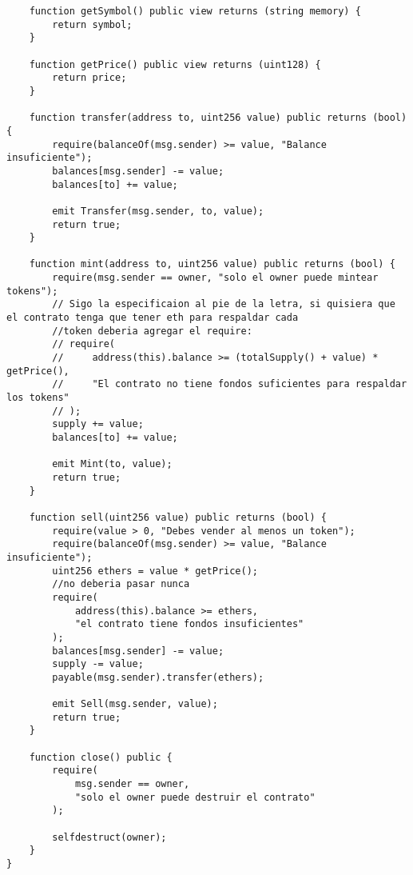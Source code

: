 \documentclass[12pt,addpoints,answers]{exam}
\begin{document}
\begin{questions}
\begin{parts}
\begin{verbatim}
    function getSymbol() public view returns (string memory) {
        return symbol;
    }

    function getPrice() public view returns (uint128) {
        return price;
    }

    function transfer(address to, uint256 value) public returns (bool) {
        require(balanceOf(msg.sender) >= value, "Balance insuficiente");
        balances[msg.sender] -= value;
        balances[to] += value;

        emit Transfer(msg.sender, to, value);
        return true;
    }

    function mint(address to, uint256 value) public returns (bool) {
        require(msg.sender == owner, "solo el owner puede mintear tokens");
        // Sigo la especificaion al pie de la letra, si quisiera que el contrato tenga que tener eth para respaldar cada
        //token deberia agregar el require:
        // require(
        //     address(this).balance >= (totalSupply() + value) * getPrice(),
        //     "El contrato no tiene fondos suficientes para respaldar los tokens"
        // );
        supply += value;
        balances[to] += value;

        emit Mint(to, value);
        return true;
    }

    function sell(uint256 value) public returns (bool) {
        require(value > 0, "Debes vender al menos un token");
        require(balanceOf(msg.sender) >= value, "Balance insuficiente");
        uint256 ethers = value * getPrice();
        //no deberia pasar nunca
        require(
            address(this).balance >= ethers,
            "el contrato tiene fondos insuficientes"
        );
        balances[msg.sender] -= value;
        supply -= value;
        payable(msg.sender).transfer(ethers);

        emit Sell(msg.sender, value);
        return true;
    }

    function close() public {
        require(
            msg.sender == owner,
            "solo el owner puede destruir el contrato"
        );

        selfdestruct(owner);
    }
}
      \end{verbatim}
\end{parts}

\newpage


~\\

\end{questions}
\end{document}
